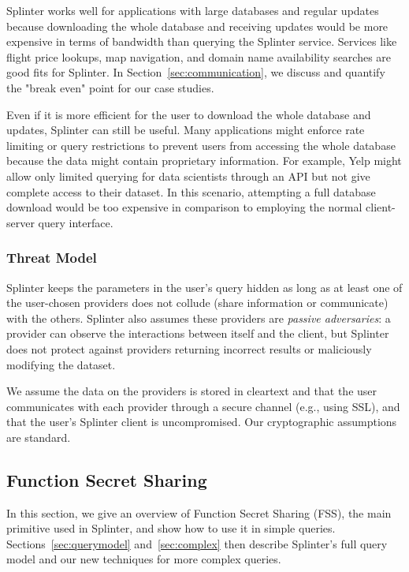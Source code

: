 Splinter works well for applications with large databases
and regular updates because downloading the whole
database and receiving updates would be more expensive in terms
of bandwidth than querying the Splinter service. Services
like flight price lookups, map navigation,
and domain name availability searches are good fits for Splinter.
In Section~\ref{sec:communication}, we discuss and 
quantify the "break even" point for our case studies.

Even if it is more efficient for the user to download the whole
database and updates, Splinter can still be useful.
Many applications might enforce rate limiting or query restrictions
to prevent users from accessing the whole database
because the data might contain proprietary information.
For example, Yelp might allow only limited querying
for data scientists through an API but not give complete access to their dataset.
In this scenario, attempting a full database download would be too expensive
in comparison to employing the normal client-server query interface.

\subsubsection{Threat Model}
Splinter keeps the parameters in the user's query hidden
as long as at least one of the user-chosen providers does not collude (share information or communicate) with the others.
Splinter also assumes these providers are \textit{passive adversaries}: a provider can observe the interactions between
itself and the client, but 
Splinter does not protect against providers returning incorrect results or maliciously modifying the dataset.

We assume the data on the providers 
is stored in cleartext and that the user communicates with each provider through a secure channel (e.g., using SSL),
and that the user's Splinter client is uncompromised.
Our cryptographic assumptions are standard.

\subsection{Function Secret Sharing}
\label{sec:queries}
In this section, we give an overview of Function Secret Sharing (FSS),
the main primitive used in Splinter, and show how to use it in simple queries.
Sections~\ref{sec:querymodel} and~\ref{sec:complex} then describe Splinter's full
query model and our new techniques for more complex queries.

